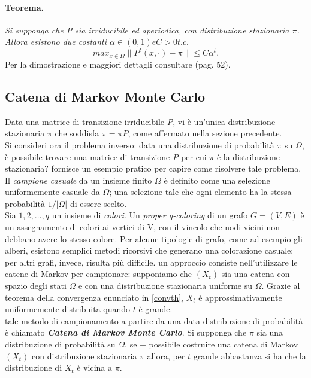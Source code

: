 \paragraph{Teorema.} \textit{Si supponga che P sia irriducibile ed aperiodica, con distribuzione stazionaria $\pi$. Allora esistono due costanti $\alpha \in (0,1) e C > 0 t.c.$}
\begin{equation}
	max_{x\in\Omega}\|P^t(x,\cdot) - \pi\| \leq C\alpha^t.
	\label{convth}
\end{equation}
Per la dimostrazione e maggiori dettagli consultare \cite{levin2009markov} (pag. 52).
\subsection{Catena di Markov Monte Carlo}
Data una matrice di transizione irriducibile \textit{P}, vi è un'unica distribuzione stazionaria $\pi$ che soddisfa $\pi = \pi P$, come affermato nella sezione precedente.\\
Si consideri ora il problema inverso: data una distribuzione di probabilità $\pi$ su $\Omega$, è possibile trovare una matrice di transizione \textit{P} per cui $\pi$ è la distribuzione stazionaria? \cite{levin2009markov} fornisce un esempio pratico per capire come risolvere tale problema.\\
Il \textit{campione casuale} da un insieme finito $\Omega$ è definito come una selezione uniformemente casuale da $\Omega$; una selezione tale che ogni elemento ha la stessa probabilità $1/|\Omega|$ di essere scelto.\\
Sia ${1, 2, \dots, q}$ un insieme di \textit{colori}. Un \textit{proper q-coloring} di un grafo $G=(V, E)$ è un assegnamento di colori ai vertici di V, con il vincolo che nodi vicini non debbano avere lo stesso colore. Per alcune tipologie di grafo, come ad esempio gli alberi, esistono semplici metodi ricorsivi che generano una colorazione casuale; per altri grafi, invece, risulta più difficile. un approccio consiste nell'utilizzare le catene di Markov per campionare: supponiamo che $(X_t)$ sia una catena con spazio degli stati $\Omega$ e con una distribuzione stazionaria uniforme su $\Omega$. Grazie al teorema della convergenza enunciato in \ref{convth}, $X_t$ è approssimativamente uniformemente distribuita quando $t$ è grande.\\
tale metodo di campionamento a partire da una data distribuzione di probabilità è chiamato \textit{\textbf{Catena di Markov Monte Carlo}}. Si supponga che $\pi$ sia una distribuzione di probabilità su $\Omega$. se + possibile costruire una catena di Markov $(X_t)$ con distribuzione stazionaria $\pi$ allora, per $t$ grande abbastanza si ha che la distribuzione di $X_t$ è vicina a $\pi$.
